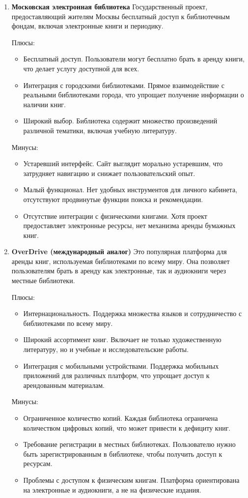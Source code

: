 \begin{enumerate}
  \item \textbf{Московская электронная библиотека}
  Государственный проект, предоставляющий жителям Москвы бесплатный доступ к библиотечным фондам, включая электронные книги и периодику.

  Плюсы:
  \begin{itemize}
    \item Бесплатный доступ. Пользователи могут бесплатно брать в аренду книги, что делает услугу доступной для всех.
    \item Интеграция с городскими библиотеками. Прямое взаимодействие с реальными библиотеками города, что упрощает получение информации о наличии книг.
    \item Широкий выбор. Библиотека содержит множество произведений различной тематики, включая учебную литературу.
  \end{itemize}

  Минусы:
  \begin{itemize}
    \item Устаревший интерфейс. Сайт выглядит морально устаревшим, что затрудняет навигацию и снижает пользовательский опыт.
    \item Малый функционал. Нет удобных инструментов для личного кабинета, отсутствуют продвинутые функции поиска и рекомендации.
    \item Отсутствие интеграции с физическими книгами. Хотя проект предоставляет электронные ресурсы, нет механизма аренды бумажных книг.
  \end{itemize}

  \item \textbf{OverDrive (международный аналог)}
  Это популярная платформа для аренды книг, используемая библиотеками по всему миру. Она позволяет пользователям брать в аренду как электронные, так и аудиокниги через местные библиотеки.

  Плюсы:
  \begin{itemize}
    \item Интернациональность. Поддержка множества языков и сотрудничество с библиотеками по всему миру.
    \item Широкий ассортимент книг. Включает не только художественную литературу, но и учебные и исследовательские работы.
    \item Интеграция с мобильными устройствами. Поддержка мобильных приложений для различных платформ, что упрощает доступ к арендованным материалам.
  \end{itemize}

  Минусы:
  \begin{itemize}
    \item Ограниченное количество копий. Каждая библиотека ограничена количеством цифровых копий, что может привести к дефициту книг.
    \item Требование регистрации в местных библиотеках. Пользователю нужно быть зарегистрированным в библиотеке, чтобы получить доступ к ресурсам.
    \item Проблемы с доступом к физическим книгам. Платформа ориентирована на электронные и аудиокниги, а не на физические издания.
  \end{itemize}
\end{enumerate}

